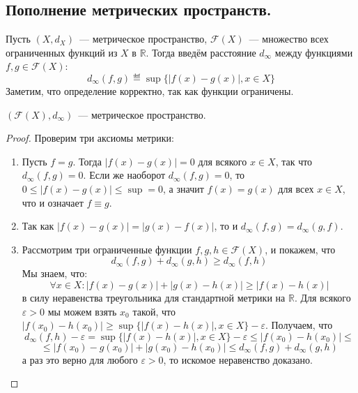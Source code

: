 \documentclass[11pt]{article}
\begin{document}
    \subsection{Пополнение метрических пространств.}

    \begin{definition}
    Пусть $(X, d_X)$~--- метрическое пространство, $\mathcal{F}(X)$~--- множество всех ограниченных функций из $X$ в $\mathbb{R}$. Тогда введём расстояние $d_{\infty}$ между функциями $f, g \in \mathcal{F}(X)$:
    \begin{equation*}
        d_{\infty}(f, g) \eqdef \sup\{|f(x) - g(x)|, x \in X\}
    \end{equation*}
    Заметим, что определение корректно, так как функции ограничены.
    \end{definition}

    \begin{lemma}

    $(\mathcal{F}(X), d_{\infty})$~--- метрическое пространство.

    \end{lemma}

    \begin{proof}

     Проверим три аксиомы метрики:
    \begin{enumerate}
        \item Пусть $f = g$. Тогда $|f(x) - g(x)| = 0$ для всякого $x \in X$, так что $d_{\infty}(f, g) = 0$. Если же наоборот $d_{\infty}(f, g) = 0$, то $0 \leq |f(x) - g(x)| \leq \sup = 0$, а значит $f(x) = g(x)$ для всех $x \in X$, что и означает $f \equiv g$.
        \item Так как $|f(x) - g(x)| = |g(x) - f(x)|$, то и $d_{\infty}(f, g) = d_{\infty}(g, f)$.
        \item Рассмотрим три ограниченные функции $f, g, h \in \mathcal{F}(X)$, и покажем, что
        \begin{equation*}
            d_{\infty}(f, g) + d_{\infty}(g, h) \geq d_{\infty}(f, h)
        \end{equation*}
        Мы знаем, что:
        \begin{equation*}
            \forall x \in X: |f(x) - g(x)| + |g(x) - h(x)| \geq |f(x) - h(x)|
        \end{equation*}
        в силу неравенства треугольника для стандартной метрики на $\mathbb{R}$. Для всякого $\varepsilon > 0$ мы можем взять $x_0$ такой, что $|f(x_0) - h(x_0)| \geq \sup\{|f(x) - h(x)|, x \in X\} - \varepsilon$. Получаем, что
        \begin{equation*}
            d_{\infty}(f, h) - \varepsilon = \sup\{|f(x) - h(x)|, x \in X\} - \varepsilon \leq |f(x_0) - h(x_0)| \leq
        \end{equation*}
        \begin{equation*}
            \leq |f(x_0) - g(x_0)| + |g(x_0) - h(x_0)| \leq d_{\infty}(f, g) + d_{\infty}(g, h)
        \end{equation*}
        а раз это верно для любого $\varepsilon > 0$, то искомое неравенство доказано.
    \end{enumerate}
    \end{proof}
\end{document}
